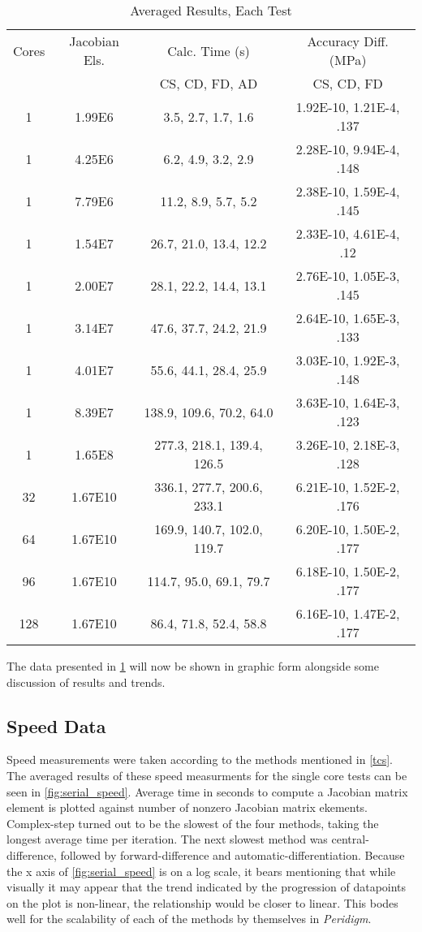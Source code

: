 \documentclass[preprint,12pt]{elsarticle}
\begin{document}
\begin{table}    
        \caption{Averaged Results, Each Test} \label{tab:results}   
    \begin{tabular}{c c c c }
    Cores & Jacobian Els. & Calc. Time (s) & Accuracy Diff. (MPa)\\ 
    \multicolumn{2}{c}{} & CS, CD, FD, AD & CS, CD, FD \\ \hline 
	1 & 1.99E6  & 3.5, 2.7, 1.7, 1.6 & 1.92E-10, 1.21E-4, .137 \\ \hline
	1 & 4.25E6  & 6.2, 4.9, 3.2, 2.9 & 2.28E-10, 9.94E-4, .148 \\ \hline
	1 & 7.79E6  & 11.2, 8.9, 5.7, 5.2 & 2.38E-10, 1.59E-4, .145\\ \hline
	1 & 1.54E7  & 26.7, 21.0, 13.4, 12.2 & 2.33E-10, 4.61E-4, .12 \\ \hline
	1 & 2.00E7  & 28.1, 22.2, 14.4, 13.1 & 2.76E-10, 1.05E-3, .145 \\ \hline
	1 & 3.14E7  & 47.6, 37.7, 24.2, 21.9 & 2.64E-10, 1.65E-3, .133 \\ \hline
	1 & 4.01E7  & 55.6, 44.1, 28.4, 25.9 & 3.03E-10, 1.92E-3, .148 \\ \hline
	1 & 8.39E7  & 138.9, 109.6, 70.2, 64.0 & 3.63E-10, 1.64E-3, .123 \\ \hline
	1 & 1.65E8  & 277.3, 218.1, 139.4, 126.5 & 3.26E-10, 2.18E-3, .128 \\ \hline
	32 & 1.67E10  & 336.1, 277.7, 200.6, 233.1 & 6.21E-10, 1.52E-2, .176 \\ \hline
	64 & 1.67E10  & 169.9, 140.7, 102.0, 119.7 & 6.20E-10, 1.50E-2, .177 \\ \hline
	96 & 1.67E10  & 114.7, 95.0, 69.1, 79.7 & 6.18E-10, 1.50E-2, .177 \\ \hline
	128 & 1.67E10  & 86.4, 71.8, 52.4, 58.8 & 6.16E-10, 1.47E-2, .177 \\ \hline
    \end{tabular}
\end{table}



The data presented in \ref{tab:results} will now be shown in graphic form alongside some discussion
of results and trends.

\subsection{Speed Data}
Speed measurements were taken according to the methods mentioned in \ref{tcs}. The averaged results
of these speed measurments for the single core tests can be seen in \ref{fig:serial_speed}.
Average time in seconds to compute a Jacobian matrix element is plotted against number of nonzero
Jacobian matrix ekements.
Complex-step turned out to be the slowest of the four methods, taking the longest average time per
iteration. The next slowest method was central-difference, followed by forward-difference and
automatic-differentiation. Because the x axis of \ref{fig:serial_speed} is on a log scale, it
bears mentioning that while visually it may appear that the trend indicated by the progression of
datapoints on the plot is non-linear, the relationship would be closer to linear. This bodes well
for the scalability of each of the methods by themselves in \emph{Peridigm}. 
\end{document}
